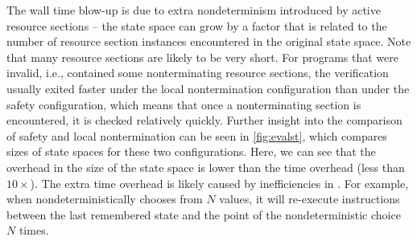 The wall time blow-up is due to extra nondeterminism introduced by active
resource sections -- the state space can grow by a factor that is related to the
number of resource section instances encountered in the original state
space. Note that many resource sections are likely to be very short. For
programs that were invalid, i.e., contained some nonterminating resource
sections, the verification usually exited faster under the local
nontermination configuration than under the safety configuration, which
means that once a nonterminating section is encountered, it is checked
relatively quickly. Further insight into the comparison of safety and local
nontermination can be seen in \autoref{fig:evalst}, which compares sizes of state
spaces for these two configurations. Here, we can see that the overhead in the
size of the state space is lower than the time overhead (less than $10 \times$).
The extra time overhead is likely caused by inefficiencies in \divine{}.  For
example, when \divine nondeterministically chooses from $N$ values, it will
re-execute instructions between the last remembered state and the point of the
nondeterministic choice $N$ times.

